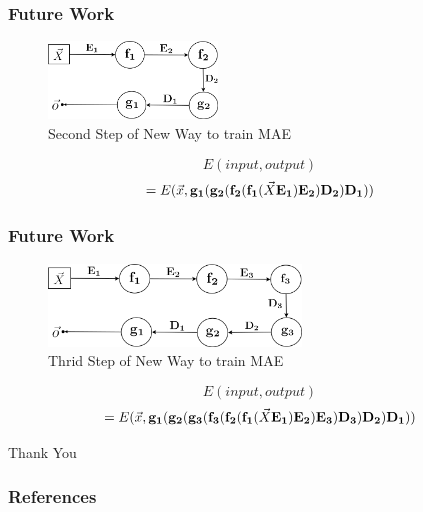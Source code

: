 \documentclass{beamer}
\begin{document}
\begin{frame}
\frametitle{Future Work}
\begin{figure}[t!]
    \centering
    \includegraphics[width=0.4\textwidth]{../paper/pictures/figures/train_new_MAE2.png}
    \caption{Second Step of New Way to train MAE}
    \label{fig:train_NMAE2}
\end{figure}

$$E(input, output)$$
$$=E(\vec{x}, \bold{g_1}(\bold{g_2}(\bold{f_2}(\bold{f_1}(\vec{X}\bold{E_1})\bold{E_2})\bold{D_2})\bold{D_1}))$$
\end{frame}

\begin{frame}
\frametitle{Future Work}
\begin{figure}[t!]
    \centering
    \includegraphics[width=0.6\textwidth]{../paper/pictures/figures/train_new_MAE3.png}
    \caption{Thrid Step of New Way to train MAE}
    \label{fig:train_NMAE3}
\end{figure}

$$E(input, output)$$
$$=E(\vec{x}, \bold{g_1}(\bold{g_2}(\bold{g_3}(\bold{f_3}(\bold{f_2}(\bold{f_1}(\vec{X}\bold{E_1})\bold{E_2})\bold{E_3})\bold{D_3})\bold{D_2})\bold{D_1}))$$
\end{frame}

\begin{frame}
\begin{center} 
\Huge Thank You 
\end{center} 
\end{frame}


\begin{frame}[allowframebreaks]
\frametitle{References}


\end{frame}
\end{document}
